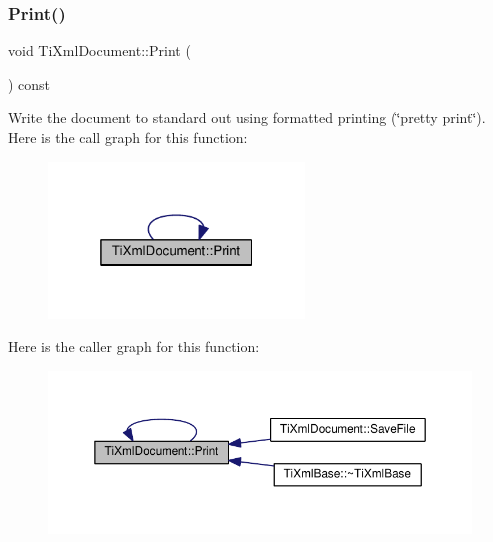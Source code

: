 \subsubsection{\texorpdfstring{Print()}{Print()}\hspace{0.1cm}{\footnotesize\ttfamily [1/2]}}
{\footnotesize\ttfamily void Ti\+Xml\+Document\+::\+Print (\begin{DoxyParamCaption}{ }\end{DoxyParamCaption}) const\hspace{0.3cm}{\ttfamily [inline]}}

Write the document to standard out using formatted printing (\char`\"{}pretty print\char`\"{}). Here is the call graph for this function\+:\nopagebreak
\begin{figure}[H]
\begin{center}
\leavevmode
\includegraphics[width=193pt]{class_ti_xml_document_aa4e8c1498a76dcde7191c683e1220882_cgraph}
\end{center}
\end{figure}
Here is the caller graph for this function\+:\nopagebreak
\begin{figure}[H]
\begin{center}
\leavevmode
\includegraphics[width=350pt]{class_ti_xml_document_aa4e8c1498a76dcde7191c683e1220882_icgraph}
\end{center}
\end{figure}
\mbox{\label{class_ti_xml_document_aa9e166fae51da603641380a964f21eeb}} 
